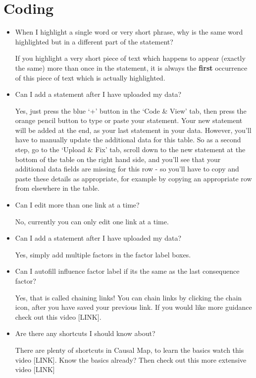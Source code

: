 \documentclass[
]{book}
\begin{document}
\hypertarget{coding}{%
\section{Coding}\label{coding}}

\begin{itemize}
\item
  When I highlight a single word or very short phrase, why is the same word highlighted but in a different part of the statement?

  If you highlight a very short piece of text which happens to appear (exactly the same) more than once in the statement, it is always the \textbf{first} occurrence of this piece of text which is actually highlighted.
\item
  Can I add a statement after I have uploaded my data?

  Yes, just press the blue `+' button in the `Code \& View' tab, then press the orange pencil button to type or paste your statement. Your new statement will be added at the end, as your last statement in your data. However, you'll have to manually update the additional data for this table. So as a second step, go to the `Upload \& Fix' tab, scroll down to the new statement at the bottom of the table on the right hand side, and you'll see that your additional data fields are missing for this row - so you'll have to copy and paste these details as appropriate, for example by copying an appropriate row from elsewhere in the table.
\item
  Can I edit more than one link at a time?

  No, currently you can only edit one link at a time.
\item
  Can I add a statement after I have uploaded my data?

  Yes, simply add multiple factors in the factor label boxes.
\item
  Can I autofill influence factor label if its the same as the last consequence factor?

  Yes, that is called chaining links! You can chain links by clicking the chain icon, after you have saved your previous link. If you would like more guidance check out this video {[}LINK{]}.
\item
  Are there any shortcuts I should know about?

  There are plenty of shortcuts in Causal Map, to learn the basics watch this video {[}LINK{]}. Know the basics already? Then check out this more extensive video {[}LINK{]}


\end{itemize}
\end{document}
